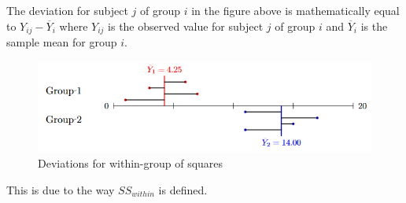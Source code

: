 The deviation for subject $j$ of group $i$ in the figure above is mathematically equal to $Y_{ij}-
\overline{Y}_{i}$ where $Y_{ij}$ is the observed value for subject $j$ of group $i$ and $\overline{Y}_{i}$ is the sample mean for group $i$.
\begin{figure}[H]
	\begin{center}
		\includegraphics[width=\textwidth]{./chapters/2_statistics/05_common_statistical_tests/2_images/1_anova_inter_grp.PNG}
	\end{center}
	\caption{Deviations for within-group of squares}
	\label{fig:3_anovaInterGrp}
\end{figure}
\begin{center}
\end{center}

 This is due to the way $SS_{within}$ is defined.

